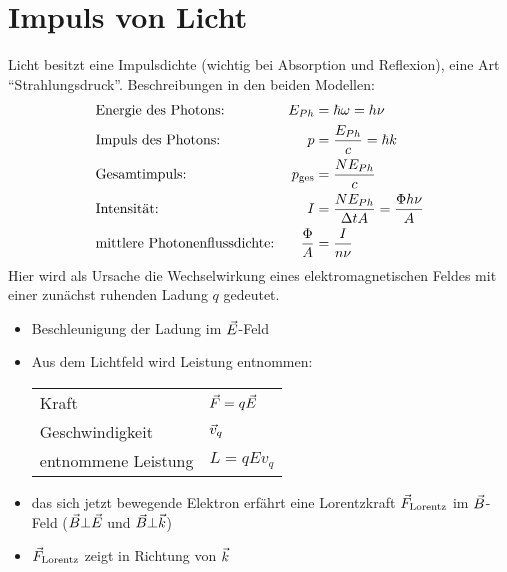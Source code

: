 \section{Impuls von Licht}
Licht besitzt eine Impulsdichte (wichtig bei Absorption und
Reflexion), eine Art \enquote{Strahlungsdruck}. Beschreibungen in den
beiden Modellen:
\begin{align*}
  &\text{Energie des Photons:\index{Photonenenergie}} 
  & E_{Ph}&=\hbar\omega=h\nu\\
  &\text{Impuls des Photons:\index{Photonenimpuls}} 
  & p &= \frac{E_{Ph}}{c}=\hbar k\\
  &\text{Gesamtimpuls:} 
  & p_\text{ges} &= \frac{N E_{Ph}}{c}\\
  &\text{Intensität:} 
  & I &= \frac{N E_{Ph}}{\Delta t A} = \frac{\Phi h \nu}{A}\\
  &\text{mittlere Photonenflussdichte:\index{Photonenflussdichte}} 
  &\frac{\Phi}{A} &= \frac{I}{n\nu}\\
\end{align*}%
%
%
%
%
%
Hier wird als Ursache die Wechselwirkung eines elektromagnetischen
Feldes mit einer zunächst ruhenden Ladung $q$ gedeutet.
\begin{itemize}
\item Beschleunigung der Ladung im $\vec{E}$-Feld 
\item Aus dem Lichtfeld wird Leistung entnommen:\\
  \begin{tabular}{ll}
    Kraft 
    & $\vec{F} = q\vec{E}$%
      \nomenclature{$q$}{elektrische Ladung}\\
    Geschwindigkeit 
    & $\vec{v}_q$%
      \nomenclature{$v_q$}{Geschwindigkeit eines Teilchens mit Ladung $q$}\\
    entnommene Leistung & $L = qEv_q$
  \end{tabular}
\item das sich jetzt bewegende Elektron erfährt eine Lorentzkraft $\vec{F}_\text{Lorentz}$
  im $\vec{B}$-Feld ($\vec{B}\bot\vec{E}$ und $\vec{B}\bot\vec{k}$)
\item $\vec{F}_\text{Lorentz}$ zeigt in Richtung von $\vec{k}$
\end{itemize}

